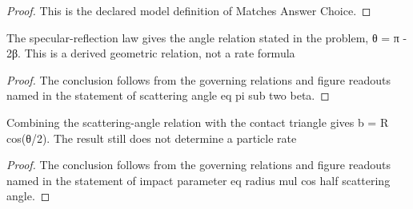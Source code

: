 \begin{proof}
  This is the declared model definition of Matches Answer Choice.
\end{proof}
\begin{lemma}
  \label{lem:physics:phyx-mini-0562:phyxminiproblems-problemphyxmini0562-scattering-angle-eq-pi-sub-two-beta}
  The specular-reflection law gives the angle relation stated in the problem, θ = π - 2β. This is a derived geometric relation, not a rate formula
\end{lemma}
\begin{proof}
  The conclusion follows from the governing relations and figure readouts named in the statement of scattering angle eq pi sub two beta.
\end{proof}
\begin{lemma}
  \label{lem:physics:phyx-mini-0562:phyxminiproblems-problemphyxmini0562-impact-parameter-eq-radius-mul-cos-half-scattering-angle}
  Combining the scattering-angle relation with the contact triangle gives b = R cos(θ/2). The result still does not determine a particle rate
\end{lemma}
\begin{proof}
  The conclusion follows from the governing relations and figure readouts named in the statement of impact parameter eq radius mul cos half scattering angle.
\end{proof}
